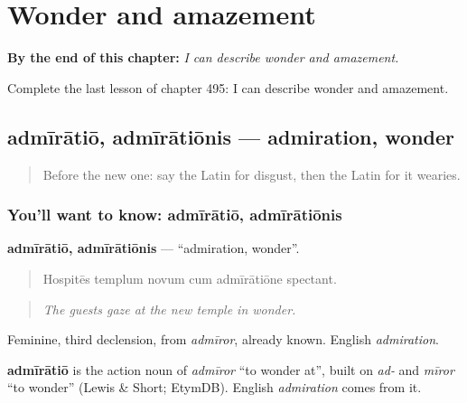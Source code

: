 
\chapter{Wonder and amazement}
\label{ch:la-wonder-and-amazement}

\begin{chapteropening}
\textbf{By the end of this chapter:} \emph{I can describe wonder and amazement.}

Complete the last lesson of chapter 495: I can describe wonder and amazement.
\end{chapteropening}

\section[admīrātiō, admīrātiōnis]{admīrātiō, admīrātiōnis — admiration, wonder}

\label{lesson:LA-C495-admiratio}



\begin{quote}
Before the new one: say the Latin for disgust, then the Latin for it wearies.
\end{quote}

\subsection*{You'll want to know: admīrātiō, admīrātiōnis}
\textbf{admīrātiō, admīrātiōnis} — \textquotedblleft{}admiration, wonder\textquotedblright{}.

\begin{quote}
Hospitēs templum novum cum admīrātiōne spectant.
\end{quote}

\begin{quote}
\emph{The guests gaze at the new temple in wonder.}
\end{quote}

Feminine, third declension, from \emph{admīror}, already known. English \emph{admiration}.

\begin{cousinweb}
\textbf{admīrātiō} is the action noun of \emph{admīror} \textquotedblleft{}to wonder at\textquotedblright{}, built on \emph{ad-} and \emph{mīror} \textquotedblleft{}to wonder\textquotedblright{} (Lewis \& Short; EtymDB). English \emph{admiration} comes from it.
\end{cousinweb}

